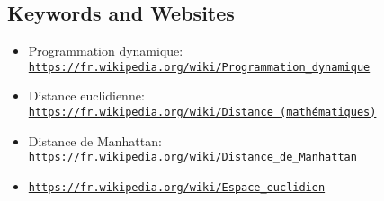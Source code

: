 \documentclass[a4paper,11pt]{report}
\newcommand{\BrochureUrlText}[1]{\texttt{#1}}
\begin{document}
{\raggedright

\subsection*{Keywords and Websites}

\begin{itemize}
  \item Programmation dynamique: \href{https://fr.wikipedia.org/wiki/Programmation_dynamique}{\BrochureUrlText{https://fr.wikipedia.org/wiki/Programmation\_dynamique}}
  \item Distance euclidienne: \href{https://fr.wikipedia.org/wiki/Distance_(math\%C3\%A9matiques)}{\BrochureUrlText{https://fr.wikipedia.org/wiki/Distance\_(mathématiques)}}
  \item Distance de Manhattan: \href{https://fr.wikipedia.org/wiki/Distance_de_Manhattan}{\BrochureUrlText{https://fr.wikipedia.org/wiki/Distance\_de\_Manhattan}}
  \item \href{https://fr.wikipedia.org/wiki/Espace_euclidien}{\BrochureUrlText{https://fr.wikipedia.org/wiki/Espace\_euclidien}}
\end{itemize}


}
\end{document}
